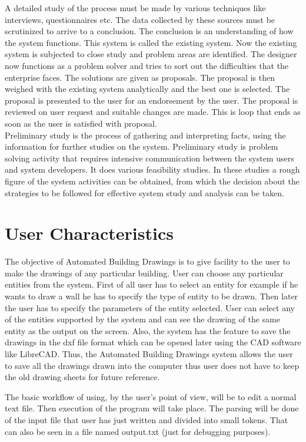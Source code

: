 \noindent A detailed study of the process must be made by various techniques like interviews, questionnaires etc. The data collected by these sources must be scrutinized to arrive to a conclusion. The conclusion is an understanding of how the system functions. This system is called the existing system. Now the existing system is subjected to close study and problem areas are identified. The designer now functions as a problem solver and tries to sort out the difficulties that the enterprise faces. The solutions are given as proposals. The proposal is then weighed with the existing system analytically and the best one is selected. The proposal is presented to the user for an endorsement by the user. The proposal is reviewed on user request and suitable changes are made. This is loop that ends as soon as the user is satisfied with proposal.\\

\noindent Preliminary study is the process of gathering and interpreting facts, using the information for further studies on the system. Preliminary study is problem solving activity that requires intensive communication between the system users and system developers. It does various feasibility studies. In these studies a rough figure of the system activities can be obtained, from which the decision about the strategies to be followed for effective system study and analysis can be taken.

\section{User Characteristics}
The objective of  Automated Building Drawings is to give facility to the user to make the drawings of any particular building. User can choose any particular entities from the system. First of all user has to select an entity for example if he wants to draw a wall he has to specify the type of entity to be drawn. Then later the user has to specify the parameters of the entity selected. User can select any of the entities supported by the system and can see the drawing of the same entity as the output on the screen. Also, the system has the feature to save the drawings in the dxf file format which can be opened later using the CAD software like LibreCAD. Thus, the Automated Building Drawings system allows the user to save all the drawings drawn into the computer thus user does not have to keep the old drawing sheets for future reference.

The basic workflow of using, by the user's point of view, will be to edit a normal text file. Then execution of the program will take place. The parsing will be done of the input file that user has just written and divided into small tokens. That can also be seen in a file named output.txt (just for debugging purposes).

